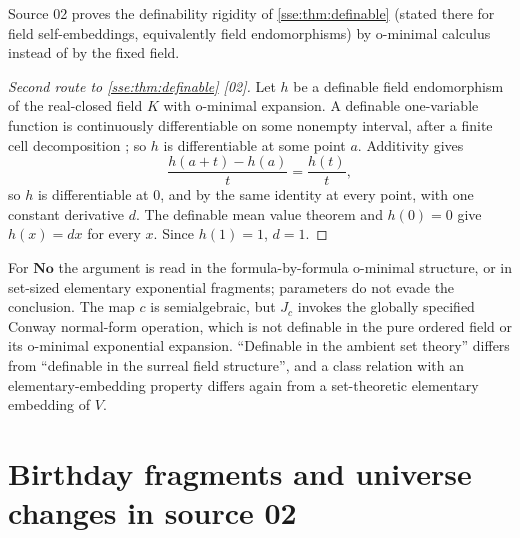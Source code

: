 \documentclass[11pt,a4paper]{article}
\numberwithin{equation}{section}
\theoremstyle{plain}
\theoremstyle{definition}
\theoremstyle{remark}
\newcommand{\No}{\mathbf{No}}
\newcommand{\src}[1]{\textup{\textsf{\small[#1]}}}%
\begin{document}
Source 02 proves the definability rigidity of \cref{sse:thm:definable}
(stated there for field self-embeddings, equivalently field endomorphisms)
by o-minimal calculus instead of by the fixed field.

\begin{proof}[Second route to \cref{sse:thm:definable} \src{02}]
Let $h$ be a definable field endomorphism of the real-closed field $K$
with o-minimal expansion. A definable one-variable function is continuously
differentiable on some nonempty interval, after a finite cell decomposition
\cite{pf-Tame}; so $h$ is differentiable at some point $a$. Additivity gives
\[
 \frac{h(a+t)-h(a)}{t}=\frac{h(t)}{t},
\]
so $h$ is differentiable at $0$, and by the same identity at every point,
with one constant derivative $d$. The definable mean value theorem and
$h(0)=0$ give $h(x)=dx$ for every $x$. Since $h(1)=1$, $d=1$.
\end{proof}
For $\No$ the argument is read in the formula-by-formula o-minimal
structure, or in set-sized elementary exponential fragments; parameters do
not evade the conclusion. The map $c$ is semialgebraic, but $J_c$ invokes
the globally specified Conway normal-form operation, which is not definable
in the pure ordered field or its o-minimal exponential expansion.
``Definable in the ambient set theory'' differs from ``definable in the
surreal field structure'', and a class relation with an elementary-embedding
property differs again from a set-theoretic elementary embedding of $V$.

\section{Birthday fragments and universe changes in source 02}\label{sse:pf:sec:fragments}
\end{document}
